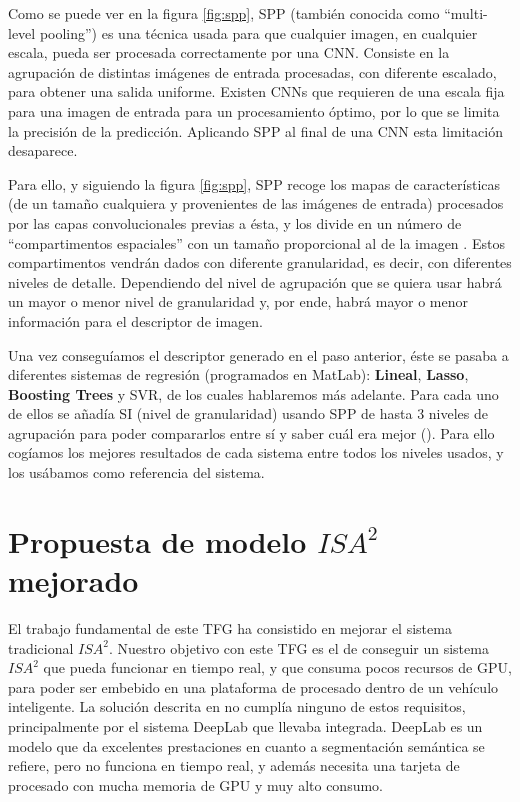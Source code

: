 Como se puede ver en la figura \ref{fig:spp}, \ac{SPP} (también conocida como ``multi-level pooling'') es una técnica usada para que cualquier imagen, en cualquier escala, pueda ser procesada correctamente por una \ac{CNN}. Consiste en la agrupación de distintas imágenes de entrada procesadas, con diferente escalado, para obtener una salida uniforme. Existen \ac{CNN}s que requieren de una escala fija para una imagen de entrada para un procesamiento óptimo, por lo que se limita la precisión de la predicción. Aplicando \ac{SPP} al final de una \ac{CNN} esta limitación desaparece.


Para ello, y siguiendo la figura \ref{fig:spp}, \ac{SPP} recoge los mapas de características (de un tamaño cualquiera y provenientes de las imágenes de entrada) procesados por las capas convolucionales previas a ésta, y los divide en un número de ``compartimentos espaciales'' con un tamaño proporcional al de la imagen \cite{spp2}. Estos compartimentos vendrán dados con diferente granularidad, es decir, con diferentes niveles de detalle. Dependiendo del nivel de agrupación que se quiera usar habrá un mayor o menor nivel de granularidad y, por ende, habrá mayor o menor información para el descriptor de imagen.


Una vez conseguíamos el descriptor generado en el paso anterior, éste se pasaba a diferentes sistemas de regresión (programados en MatLab): \textbf{Lineal}, \textbf{Lasso}, \textbf{Boosting Trees} y \ac{SVR}, de los cuales hablaremos más adelante. Para cada uno de ellos se añadía \ac{SI} (nivel de granularidad) usando \ac{SPP} de hasta 3 niveles de agrupación para poder compararlos entre sí y saber cuál era mejor (\cite{isa2}). Para ello cogíamos los mejores resultados de cada sistema entre todos los niveles usados, y los usábamos como referencia del sistema.


\section{Propuesta de modelo $ISA^{2}$ mejorado}
\label{sec:isa2_modelo_nuevo}
El trabajo fundamental de este TFG ha consistido en mejorar el sistema tradicional $ISA^{2}$. Nuestro objetivo con este TFG es el de conseguir un sistema $ISA^{2}$ que pueda funcionar en tiempo real, y que consuma pocos recursos de GPU, para poder ser embebido en una plataforma de procesado dentro de un vehículo inteligente. La solución descrita en \cite{isa2} no cumplía ninguno de estos requisitos, principalmente por el sistema DeepLab que llevaba integrada. DeepLab es un modelo que da excelentes prestaciones en cuanto a segmentación semántica se refiere, pero no funciona en tiempo real, y además necesita una tarjeta de procesado con mucha memoria de GPU y muy alto consumo.

